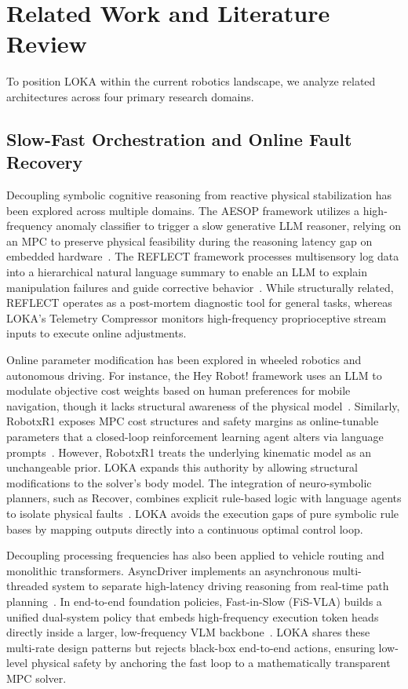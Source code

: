 \section{Related Work and Literature Review}
\label{sec:related}

To position LOKA within the current robotics landscape, we analyze related architectures across four primary research domains.

\subsection{Slow-Fast Orchestration and Online Fault Recovery}
\label{sec:related-slowfast}

Decoupling symbolic cognitive reasoning from reactive physical stabilization has been explored across multiple domains.
The AESOP framework utilizes a high-frequency anomaly classifier to trigger a slow generative LLM reasoner, relying on an MPC to preserve physical feasibility during the reasoning latency gap on embedded hardware~\cite{AESOP}.
The REFLECT framework processes multisensory log data into a hierarchical natural language summary to enable an LLM to explain manipulation failures and guide corrective behavior~\cite{REFLECT}.
While structurally related, REFLECT operates as a post-mortem diagnostic tool for general tasks, whereas LOKA's Telemetry Compressor monitors high-frequency proprioceptive stream inputs to execute online adjustments.

Online parameter modification has been explored in wheeled robotics and autonomous driving.
For instance, the Hey Robot! framework uses an LLM to modulate objective cost weights based on human preferences for mobile navigation, though it lacks structural awareness of the physical model~\cite{HeyRobot}.
Similarly, RobotxR1 exposes MPC cost structures and safety margins as online-tunable parameters that a closed-loop reinforcement learning agent alters via language prompts~\cite{RobotxR1}.
However, RobotxR1 treats the underlying kinematic model as an unchangeable prior.
LOKA expands this authority by allowing structural modifications to the solver's body model.
The integration of neuro-symbolic planners, such as Recover, combines explicit rule-based logic with language agents to isolate physical faults~\cite{Recover}.
LOKA avoids the execution gaps of pure symbolic rule bases by mapping outputs directly into a continuous optimal control loop.

Decoupling processing frequencies has also been applied to vehicle routing and monolithic transformers.
AsyncDriver implements an asynchronous multi-threaded system to separate high-latency driving reasoning from real-time path planning~\cite{AsyncDriver}.
In end-to-end foundation policies, Fast-in-Slow (FiS-VLA) builds a unified dual-system policy that embeds high-frequency execution token heads directly inside a larger, low-frequency VLM backbone~\cite{FiS-VLA}.
LOKA shares these multi-rate design patterns but rejects black-box end-to-end actions, ensuring low-level physical safety by anchoring the fast loop to a mathematically transparent MPC solver.

